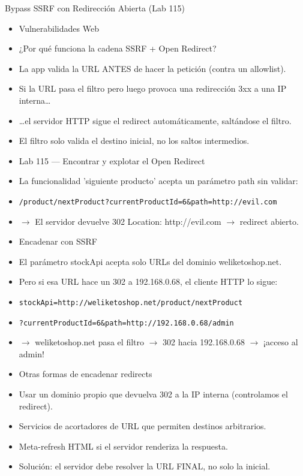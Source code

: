 \documentclass[aspectratio=169,10pt]{beamer}
\newcommand{\cmd}[1]{\texttt{\color{uznavy}#1}}
\begin{document}
\begin{frame}[allowframebreaks]{Bypass SSRF con Redirección Abierta (Lab 115)}
\small
  \begin{itemize}
  \item Vulnerabilidades Web
  \item ¿Por qué funciona la cadena SSRF + Open Redirect?
  \item La app valida la URL ANTES de hacer la petición (contra un allowlist).
  \item Si la URL pasa el filtro pero luego provoca una redirección 3xx a una IP interna\dots{}
  \item \dots{}el servidor HTTP sigue el redirect automáticamente, saltándose el filtro.
  \item El filtro solo valida el destino inicial, no los saltos intermedios.
  \item Lab 115 --- Encontrar y explotar el Open Redirect
  \item La funcionalidad 'siguiente producto' acepta un parámetro path sin validar:
  \item \cmd{/product/nextProduct?currentProductId=6\&path=http://evil.com}
  \item $\rightarrow$ El servidor devuelve 302 Location: http://evil.com $\rightarrow$ redirect abierto.
  \item Encadenar con SSRF
  \item El parámetro stockApi acepta solo URLs del dominio weliketoshop.net.
  \item Pero si esa URL hace un 302 a 192.168.0.68, el cliente HTTP lo sigue:
  \item \cmd{stockApi=http://weliketoshop.net/product/nextProduct}
  \item \cmd{?currentProductId=6\&path=http://192.168.0.68/admin}
  \item $\rightarrow$ weliketoshop.net pasa el filtro $\rightarrow$ 302 hacia 192.168.0.68 $\rightarrow$ ¡acceso al admin!
  \item Otras formas de encadenar redirects
  \item Usar un dominio propio que devuelva 302 a la IP interna (controlamos el redirect).
  \item Servicios de acortadores de URL que permiten destinos arbitrarios.
  \item Meta-refresh HTML si el servidor renderiza la respuesta.
  \item Solución: el servidor debe resolver la URL FINAL, no solo la inicial.
  \end{itemize}
\end{frame}
\end{document}
